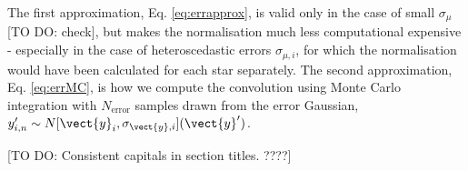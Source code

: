 The first approximation, Eq. \ref{eq:errapprox}, is valid only in the case of small $\sigma_\mu$ [TO DO: check], but makes the normalisation much less computational expensive - especially in the case of heteroscedastic errors $\sigma_{\mu,i}$, for which the normalisation would have been calculated for each star separately. The second approximation, Eq. \ref{eq:errMC}, is how we compute the convolution using Monte Carlo integration with $N_\text{error}$ samples drawn from the error Gaussian, $y'_{i,n} \sim N[\vect{y}_i,\sigma_{\vect{y},i}](\vect{y}')$.

[TO DO: Consistent capitals in section titles. ????]
